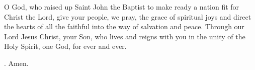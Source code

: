 \lettrine[lines=3]{O}{} God, who raised up Saint John the Baptist
to make ready a nation fit for Christ the Lord,
give your people, we pray,
the grace of spiritual joys
and direct the hearts of all the faithful
into the way of salvation and peace.
Through our Lord Jesus Christ, your Son,
who lives and reigns with you in the unity of the Holy Spirit,
one God, for ever and ever. \par \Rbar. Amen.
